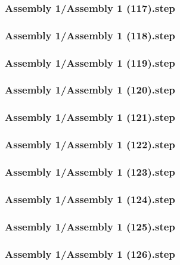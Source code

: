 \documentclass[a4paper,12pt]{article}
\begin{document}
\subsubsection{Assembly 1/Assembly 1 (117).step}

\subsubsection{Assembly 1/Assembly 1 (118).step}

\subsubsection{Assembly 1/Assembly 1 (119).step}

\subsubsection{Assembly 1/Assembly 1 (120).step}

\subsubsection{Assembly 1/Assembly 1 (121).step}

\subsubsection{Assembly 1/Assembly 1 (122).step}

\subsubsection{Assembly 1/Assembly 1 (123).step}

\subsubsection{Assembly 1/Assembly 1 (124).step}

\subsubsection{Assembly 1/Assembly 1 (125).step}

\subsubsection{Assembly 1/Assembly 1 (126).step}

\end{document}
